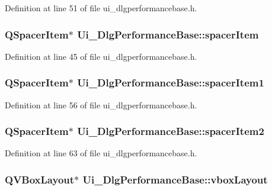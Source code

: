 Definition at line 51 of file ui\+\_\+dlgperformancebase.\+h.

\hypertarget{classUi__DlgPerformanceBase_acea1ae89922e962a9197eb648f0459ae}{
\subsubsection[{spacer\+Item}]{\setlength{\rightskip}{0pt plus 5cm}Q\+Spacer\+Item$\ast$ Ui\+\_\+\+Dlg\+Performance\+Base\+::spacer\+Item}}\label{classUi__DlgPerformanceBase_acea1ae89922e962a9197eb648f0459ae}


Definition at line 45 of file ui\+\_\+dlgperformancebase.\+h.

\hypertarget{classUi__DlgPerformanceBase_a89feb5da157af59094ed58ae423ec7d9}{
\subsubsection[{spacer\+Item1}]{\setlength{\rightskip}{0pt plus 5cm}Q\+Spacer\+Item$\ast$ Ui\+\_\+\+Dlg\+Performance\+Base\+::spacer\+Item1}}\label{classUi__DlgPerformanceBase_a89feb5da157af59094ed58ae423ec7d9}


Definition at line 56 of file ui\+\_\+dlgperformancebase.\+h.

\hypertarget{classUi__DlgPerformanceBase_a0bd18580deb85e001791945f5bfdca5b}{
\subsubsection[{spacer\+Item2}]{\setlength{\rightskip}{0pt plus 5cm}Q\+Spacer\+Item$\ast$ Ui\+\_\+\+Dlg\+Performance\+Base\+::spacer\+Item2}}\label{classUi__DlgPerformanceBase_a0bd18580deb85e001791945f5bfdca5b}


Definition at line 63 of file ui\+\_\+dlgperformancebase.\+h.

\hypertarget{classUi__DlgPerformanceBase_abae379ebe3e2f77707d6621ce00a7236}{
\subsubsection[{vbox\+Layout}]{\setlength{\rightskip}{0pt plus 5cm}Q\+V\+Box\+Layout$\ast$ Ui\+\_\+\+Dlg\+Performance\+Base\+::vbox\+Layout}}\label{classUi__DlgPerformanceBase_abae379ebe3e2f77707d6621ce00a7236}


